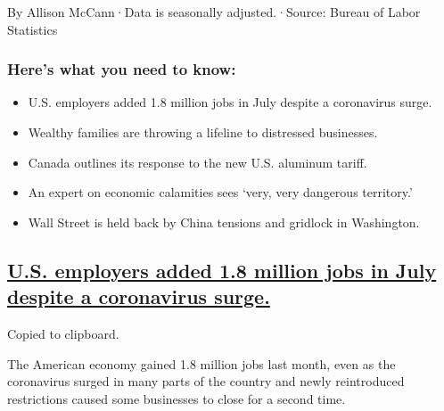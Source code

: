By Allison McCann·Data is seasonally adjusted.·Source: Bureau of Labor
Statistics

\hypertarget{heres-what-you-need-to-know}{%
\subsubsection{Here's what you need to
know:}\label{heres-what-you-need-to-know}}

\begin{itemize}
\item
  \protect\hyperlink{us-employers-added-1-8-million-jobs-in-july-despite-a-coronavirus-surge}{}

  U.S. employers added 1.8 million jobs in July despite a coronavirus
  surge.
\item
  \protect\hyperlink{wealthy-families-are-throwing-a-lifeline-to-distressed-businesses}{}

  Wealthy families are throwing a lifeline to distressed businesses.
\item
  \protect\hyperlink{canada-outlines-its-response-to-the-new-us-aluminum-tariff}{}

  Canada outlines its response to the new U.S. aluminum tariff.
\item
  \protect\hyperlink{an-expert-on-economic-calamities-sees-very-very-dangerous-territory}{}

  An expert on economic calamities sees `very, very dangerous
  territory.'
\item
  \protect\hyperlink{wall-street-is-held-back-by-china-tensions-and-gridlock-in-washington}{}

  Wall Street is held back by China tensions and gridlock in Washington.
\end{itemize}

\hypertarget{us-employers-added-18-million-jobs-in-july-despite-a-coronavirus-surge}{%
\subsection{\texorpdfstring{\protect\hyperlink{us-employers-added-1-8-million-jobs-in-july-despite-a-coronavirus-surge}{U.S.
employers added 1.8 million jobs in July despite a coronavirus
surge.}}{U.S. employers added 1.8 million jobs in July despite a coronavirus surge.}}\label{us-employers-added-18-million-jobs-in-july-despite-a-coronavirus-surge}}

Copied to clipboard.

The American economy gained 1.8 million jobs last month, even as the
coronavirus surged in many parts of the country and newly reintroduced
restrictions caused some businesses to close for a second time.

